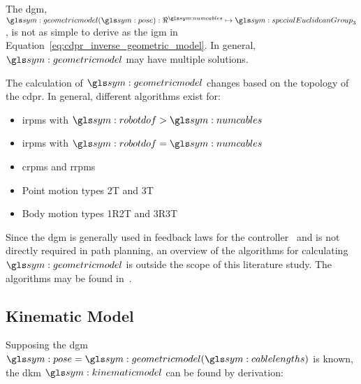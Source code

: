             The \gls{dgm},
            \(
                \geometricmodel(\pose):\Re^{\numcables}\mapsto\specialEuclideanGroup{3}
            \),
			is	 not   as	simple	 to   derive	as	  the	 \gls{igm}	  in
            Equation~\ref{eq:cdpr_inverse_geometric_model}. In general,
            $\geometricmodel$ may have multiple solutions.

			The calculation of $\geometricmodel$ changes based on  the	topology
			of the \gls{cdpr}.	In	general,  different  algorithms  exist	for:

            \begin{itemize}

                \item[]

                    \glspl{irpm} with $\robotdof > \numcables$

                \item[]

                    \glspl{irpm} with $\robotdof = \numcables$

                \item[]

                    \glspl{crpm} and \glspl{rrpm}

                \item[]

                    Point motion types 2T and 3T

                \item[]

                    Body motion types 1R2T and 3R3T

            \end{itemize}

			Since the \gls{dgm} is generally used in feedback laws for the
			controller~\cite[][page
			121]{bib:cdpr:cable_driven_parallel_robots_theory_and_application}
			and is not directly required in path planning, an overview of the
			algorithms for calculating $\geometricmodel$ is outside the scope of
			this literature study. The algorithms may be found in~\cite[][page
			137]{bib:cdpr:cable_driven_parallel_robots_theory_and_application}.

    \subsection{Kinematic Model}%
    \label{sec:kinematic_model}

		Supposing the  \gls{dgm}  $\pose  =  \geometricmodel(\cablelengths)$  is
		known,	 the   \gls{dkm}   $\kinematicmodel$	can    be	 found	  by
        derivation:

